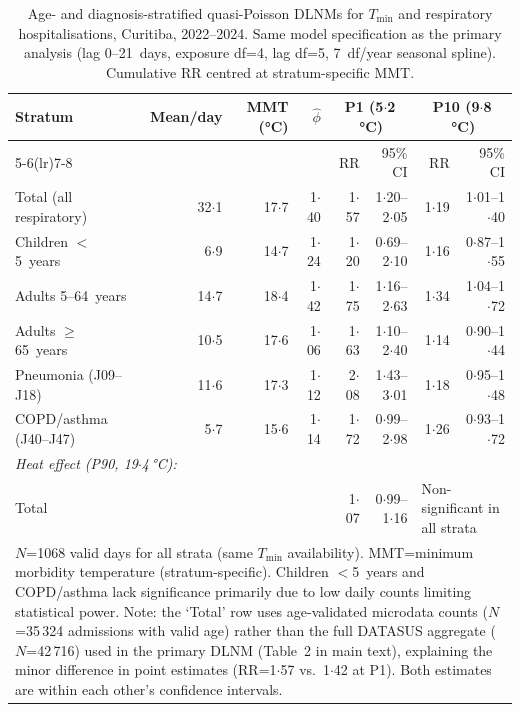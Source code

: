 \documentclass[12pt]{article}
\begin{document}
\begin{table}[ht]
\centering
\caption{Age- and diagnosis-stratified quasi-Poisson DLNMs for
$T_\mathrm{min}$ and respiratory hospitalisations, Curitiba,
2022--2024. Same model specification as the primary analysis
(lag 0--21~days, exposure df=4, lag df=5, 7~df/year seasonal spline).
Cumulative RR centred at stratum-specific MMT.}
\label{etab:stratified_dlnm}
\begin{tabular}{lrrrrrrr}
\toprule
Stratum & Mean/day & MMT (°C) & $\hat{\phi}$ &
  \multicolumn{2}{c}{P1 (5${\cdot}$2\,°C)} &
  \multicolumn{2}{c}{P10 (9${\cdot}$8\,°C)} \\
\cmidrule(lr){5-6}\cmidrule(lr){7-8}
& & & & RR & 95\% CI & RR & 95\% CI \\
\midrule
Total (all respiratory) & 32${\cdot}$1 & 17${\cdot}$7 & 1${\cdot}$40
  & 1${\cdot}$57 & 1${\cdot}$20--2${\cdot}$05
  & 1${\cdot}$19 & 1${\cdot}$01--1${\cdot}$40 \\
Children $<$5~years & 6${\cdot}$9 & 14${\cdot}$7 & 1${\cdot}$24
  & 1${\cdot}$20 & 0${\cdot}$69--2${\cdot}$10
  & 1${\cdot}$16 & 0${\cdot}$87--1${\cdot}$55 \\
Adults 5--64~years & 14${\cdot}$7 & 18${\cdot}$4 & 1${\cdot}$42
  & 1${\cdot}$75 & 1${\cdot}$16--2${\cdot}$63
  & 1${\cdot}$34 & 1${\cdot}$04--1${\cdot}$72 \\
Adults $\geq$65~years & 10${\cdot}$5 & 17${\cdot}$6 & 1${\cdot}$06
  & 1${\cdot}$63 & 1${\cdot}$10--2${\cdot}$40
  & 1${\cdot}$14 & 0${\cdot}$90--1${\cdot}$44 \\
Pneumonia (J09--J18) & 11${\cdot}$6 & 17${\cdot}$3 & 1${\cdot}$12
  & 2${\cdot}$08 & 1${\cdot}$43--3${\cdot}$01
  & 1${\cdot}$18 & 0${\cdot}$95--1${\cdot}$48 \\
COPD/asthma (J40--J47) & 5${\cdot}$7 & 15${\cdot}$6 & 1${\cdot}$14
  & 1${\cdot}$72 & 0${\cdot}$99--2${\cdot}$98
  & 1${\cdot}$26 & 0${\cdot}$93--1${\cdot}$72 \\
\midrule
\multicolumn{8}{l}{\footnotesize \textit{Heat effect (P90, 19${\cdot}$4\,°C):}} \\
Total & & & & 1${\cdot}$07 & 0${\cdot}$99--1${\cdot}$16
  & \multicolumn{2}{l}{Non-significant in all strata} \\
\bottomrule
\multicolumn{8}{p{0.95\textwidth}}{\footnotesize
$N$=1068 valid days for all strata (same $T_\mathrm{min}$ availability).
MMT=minimum morbidity temperature (stratum-specific).
Children $<$5~years and COPD/asthma lack significance primarily due
to low daily counts limiting statistical power.
Note: the `Total' row uses age-validated microdata counts
($N$=35\,324 admissions with valid age) rather than the full DATASUS
aggregate ($N$=42\,716) used in the primary DLNM (Table~2 in main
text), explaining the minor difference in point estimates
(RR=1${\cdot}$57 vs.\ 1${\cdot}$42 at P1). Both estimates are
within each other's confidence intervals.}
\end{tabular}
\end{table}
\end{document}
